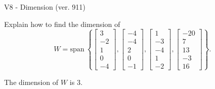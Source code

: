 \begin{exercise}
  \begin{exerciseTitle}V8 - Dimension (ver. 911)\end{exerciseTitle}
  \begin{exerciseStatement}
    Explain how to find the dimension of 
\[W=\mathrm{span}\ \left\{\left[\begin{array}{r}
3 \\
-2 \\
1 \\
0 \\
-4
\end{array}\right] , \left[\begin{array}{r}
-4 \\
-4 \\
2 \\
0 \\
-1
\end{array}\right] , \left[\begin{array}{r}
1 \\
-3 \\
-4 \\
1 \\
-2
\end{array}\right] , \left[\begin{array}{r}
-20 \\
7 \\
13 \\
-3 \\
16
\end{array}\right]\right\}.\]



  \end{exerciseStatement}
  \begin{exerciseAnswer}
   The dimension of \(W\) is  \(3\).
  


  \end{exerciseAnswer}
\end{exercise}